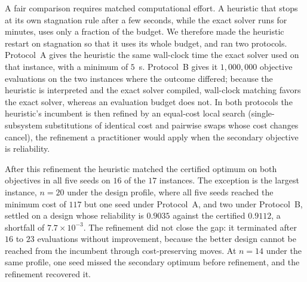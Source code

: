 \documentclass[11pt]{article}
\begin{document}
A fair comparison requires matched computational effort. A heuristic that stops at its own stagnation
rule after a few seconds, while the exact solver runs for minutes, uses only a fraction of the budget.
We therefore made the heuristic restart on stagnation so that it uses its whole budget, and ran two
protocols. Protocol~A gives the heuristic the same wall-clock time the exact solver used on that
instance, with a minimum of $5$~s. Protocol~B gives it $1{,}000{,}000$ objective evaluations on the two
instances where the outcome differed; because the heuristic is interpreted and the exact solver
compiled, wall-clock matching favors the exact solver, whereas an evaluation budget does not. In both
protocols the heuristic's incumbent is then refined by an equal-cost local search (single-subsystem
substitutions of identical cost and pairwise swaps whose cost changes cancel), the refinement a
practitioner would apply when the secondary objective is reliability.

After this refinement the heuristic matched the certified optimum on both objectives in all five seeds
on $16$ of the $17$ instances. The exception is the largest instance, $n=20$ under the design profile,
where all five seeds reached the minimum cost of $117$ but one seed under Protocol~A, and two under
Protocol~B, settled on a design whose reliability is $0.9035$ against the certified $0.9112$, a
shortfall of $7.7\times10^{-3}$. The refinement did not close the gap: it terminated after $16$ to $23$
evaluations without improvement, because the better design cannot be reached from the incumbent through
cost-preserving moves. At $n=14$ under the same profile, one seed missed the secondary optimum before
refinement, and the refinement recovered it.
\end{document}
